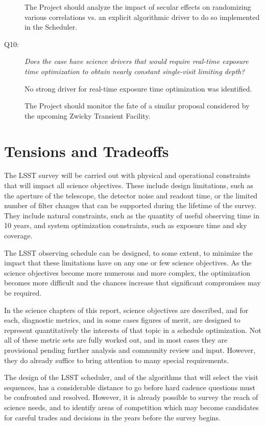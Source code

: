 \begin{description}
The Project should analyze the impact of secular effects on randomizing
various correlations vs. an explicit algorithmic driver to do so
implemented in the Scheduler.


\item[Q10:] {\it Does the case have science drivers that would require
real-time exposure time optimization to obtain nearly constant
single-visit limiting depth?}

No strong driver for real-time exposure time optimization was
identified.

The Project should monitor the fate of a similar proposal considered by
the upcoming Zwicky Transient Facility.

\end{description}



\section{Tensions and Tradeoffs}

The LSST survey will be carried out with physical and operational
constraints that will impact all science objectives.  These include
design limitations, such as the aperture of the telescope, the detector
noise and readout time, or the limited number of filter changes that
can be supported during the lifetime of the survey.  They include
natural constraints, such as the quantity of useful observing time
in 10 years, and system optimization constraints, such as
exposure time and sky coverage.

The LSST observing schedule can be designed, to some extent, to minimize
the impact that these limitations have on any one or few science
objectives. As the science objectives become more numerous and more
complex, the optimization becomes more difficult and the chances
increase that significant compromises may be required.

In the science chapters of this report, science objectives are
described, and for each, diagnostic metrics, and in some cases figures
of merit, are designed to represent quantitatively the interests of that
topic in a schedule optimization.  Not all of these metric sets are
fully worked out, and in most cases they are provisional pending further
analysis and community review and input.  However, they do already
suffice to bring attention to many special requirements.

The design of the LSST scheduler, and of the algorithms that will select
the visit sequences, has a considerable distance to go before hard
cadence questions must be confronted and resolved.  However, it is
already possible to survey the reach of science needs, and to identify
areas of competition which may become candidates for careful trades and
decisions in the years before the survey begins.

